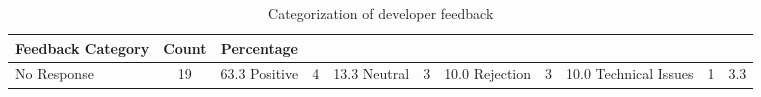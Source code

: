 \begin{table}[t]
\centering
\caption{Categorization of developer feedback}
\label{tab:rq4-feedback}
\begin{tabular}{lcc}
\toprule
Feedback Category & Count & Percentage \\
\midrule
No Response & 19 & 63.3%
Positive & 4 & 13.3%
Neutral & 3 & 10.0%
Rejection & 3 & 10.0%
Technical Issues & 1 & 3.3%
\bottomrule
\end{tabular}
\end{table}
